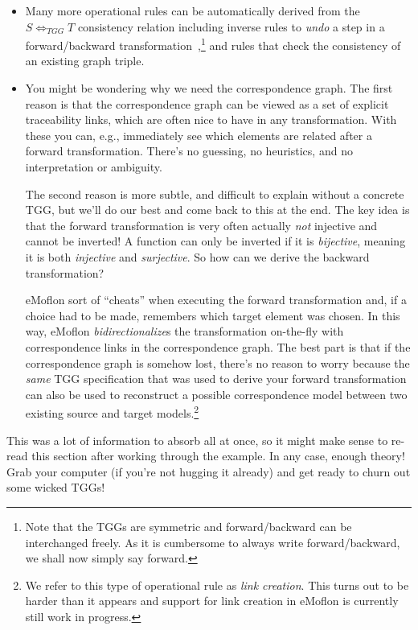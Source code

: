 \begin{itemize}

\item Many more operational rules can be automatically derived from the $S \Leftrightarrow_{TGG} T$ consistency relation including inverse rules to \emph{undo} a step in a forward/backward transformation~\cite{LAVS_ICGT_2012},\footnote{Note that the TGGs are symmetric and forward/backward can be interchanged freely. 
As it is cumbersome to always write forward/backward, we shall now simply say forward.} and rules that check the consistency of an existing graph triple.

\item You might be wondering why we need the correspondence graph. 
The first reason is that the correspondence graph can be viewed as a set of explicit traceability links, which are often nice to have in any transformation. 
With these you can, e.g., immediately see which elements are related after a forward transformation. 
There's no guessing, no heuristics, and no interpretation or ambiguity.

\vspace{0.25cm}

The second reason is more subtle, and difficult to explain without a concrete TGG, but we'll do our best and come back to this at the end. 
The key idea is that the forward transformation is very often actually \emph{not} injective and cannot be inverted! 
A function can only be inverted if it is \emph{bijective}, meaning it is both \emph{injective} and \emph{surjective}. 
So how can we derive the backward transformation?

\vspace{0.25cm}

eMoflon sort of ``cheats'' when executing the forward transformation and, if a choice had to be made, remembers which target element was chosen. 
In this way, eMoflon \emph{bidirectionalize}s the transformation on-the-fly with correspondence links in the correspondence graph. 
The best part is that if the correspondence graph is somehow lost, there's no reason to worry because the \emph{same} TGG specification that was used to derive your forward transformation
can also be used to reconstruct a possible correspondence model between two existing source and target models.\footnote{We refer to this type of operational rule as \emph{link creation}. 
This turns out to be harder than it appears and support for link creation in eMoflon is currently still work in progress.}

\end{itemize}
This was a lot of information to absorb all at once, so it might make sense to re-read this section after working through the example.
In any case, enough theory! 
Grab your computer (if you're not hugging it already) and get ready to churn out some wicked TGGs!

